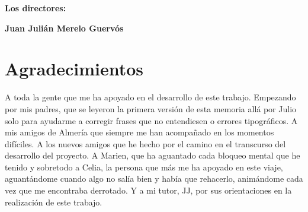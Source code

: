 \vspace{1cm}

\textbf{Los directores:}

\vspace{5cm}

\noindent \textbf{Juan Julián Merelo Guervós}

\chapter*{Agradecimientos}
\thispagestyle{empty}

       \vspace{1cm}


A toda la gente que me ha apoyado en el desarrollo de este trabajo. Empezando por mis padres, que se leyeron la primera versión de esta memoria allá por Julio solo para ayudarme a corregir frases que no entendiesen o errores tipográficos. A mis amigos de Almería que siempre me han acompañado en los momentos difíciles. A los nuevos amigos que he hecho por el camino en el transcurso del desarrollo del proyecto. A Marien, que ha aguantado cada bloqueo mental que he tenido y sobretodo a Celia, la persona que más me ha apoyado en este viaje, aguantándome cuando algo no salía bien y había que rehacerlo, animándome cada vez que me encontraba derrotado. Y a mi tutor, JJ, por sus orientaciones en la realización de este trabajo.

